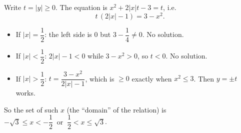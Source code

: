 Write $t=|y|\ge0$. The equation is $x^2+2|x|t-3=t$, i.e.
\[
t\,(2|x|-1)=3-x^2 .
\]
\begin{itemize}
\item If $|x|=\dfrac{1}{2}$: the left side is $0$ but $3-\dfrac{1}{4}\ne0$. No solution.
\item If $|x|<\dfrac{1}{2}$: $2|x|-1<0$ while $3-x^2>0$, so $t<0$. No solution.
\item If $|x|>\dfrac{1}{2}$: $t=\dfrac{3-x^2}{2|x|-1}$, which is $\ge0$ exactly when $x^2\le3$. Then $y=\pm t$ works.
\end{itemize}
So the set of such $x$ (the ``domain'' of the relation) is $\boxed{-\sqrt3\le x<-\dfrac{1}{2}\ \text{ or }\ \dfrac{1}{2}<x\le\sqrt3}$.
